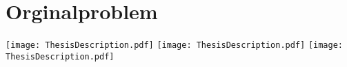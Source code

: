 
\section{Orginalproblem}

\texttt{[image: ThesisDescription.pdf]}
\newpage
\texttt{[image: ThesisDescription.pdf]}
\newpage
\texttt{[image: ThesisDescription.pdf]}
